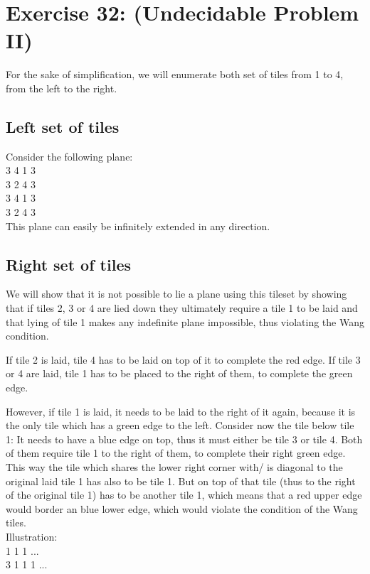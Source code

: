 \documentclass[12pt]{article}
\begin{document}
\section*{Exercise 32: (Undecidable Problem II)}

For the sake of simplification, we will enumerate both set of tiles from 1 to 4, from the left to the right.

\subsection*{Left set of tiles}

Consider the following plane:\\
3 4 1 3\\
3 2 4 3\\
3 4 1 3\\
3 2 4 3\\
This plane can easily be infinitely extended in any direction.

\subsection*{Right set of tiles}

We will show that it is not possible to lie a plane using this tileset by showing that if tiles 2, 3 or 4 are lied down they ultimately require a tile 1 to be laid and that lying of tile 1 makes any indefinite plane impossible, thus violating the Wang condition.

If tile 2 is laid, tile 4 has to be laid on top of it to complete the red edge. If tile 3 or 4 are laid, tile 1 has to be placed to the right of them, to complete the green edge. 

However, if tile 1 is laid, it needs to be laid to the right of it again, because it is the only tile which has a green edge to the left. Consider now the tile below tile 1: It needs to have a blue edge on top, thus it must either be tile 3 or tile 4. Both of them require tile 1 to the right of them, to complete their right green edge. This way the tile which shares the lower right corner with/ is diagonal to the original laid tile 1 has also to be tile 1. But on top of that tile (thus to the right of the original tile 1) has to be another tile 1, which means that a red upper edge would border an blue lower edge, which would violate the condition of the Wang tiles.\\
Illustration:\\
1 1 1 ...\\
3 1 1 1 ...\\


\end{document}
